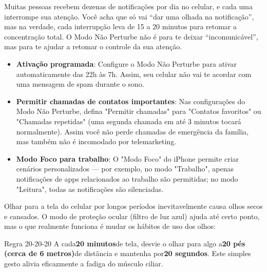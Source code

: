 
Muitas pessoas recebem dezenas de notificações por dia no celular, e cada uma interrompe sua atenção. Você acha que só vai “dar uma olhada na notificação”, mas na verdade, cada interrupção leva de 15 a 20 minutos para retomar a concentração total. O Modo Não Perturbe não é para te deixar “incomunicável”, mas para te ajudar a retomar o controle da sua atenção.

\begin{itemize}
  \item \textbf{Ativação programada}: Configure o Modo Não Perturbe para ativar automaticamente das 22h às 7h. Assim, seu celular não vai te acordar com uma mensagem de spam durante o sono.
  \item \textbf{Permitir chamadas de contatos importantes}: Nas configurações do Modo Não Perturbe, defina "Permitir chamadas" para "Contatos favoritos" ou "Chamadas repetidas" (uma segunda chamada em até 3 minutos tocará normalmente). Assim você não perde chamadas de emergência da família, mas também não é incomodado por telemarketing.
  \item \textbf{Modo Foco para trabalho}: O "Modo Foco" do iPhone permite criar cenários personalizados — por exemplo, no modo "Trabalho", apenas notificações de apps relacionados ao trabalho são permitidas; no modo "Leitura", todas as notificações são silenciadas.
\end{itemize}


Olhar para a tela do celular por longos períodos inevitavelmente causa olhos secos e cansados. O modo de proteção ocular (filtro de luz azul) ajuda até certo ponto, mas o que realmente funciona é mudar os hábitos de uso dos olhos:

\begin{tcbinfo}{Regra 20-20-20}
A cada\textbf{20 minutos}de tela, desvie o olhar para algo a\textbf{20 pés (cerca de 6 metros)}de distância e mantenha por\textbf{20 segundos}. Este simples gesto alivia eficazmente a fadiga do músculo ciliar.

\end{tcbinfo}


